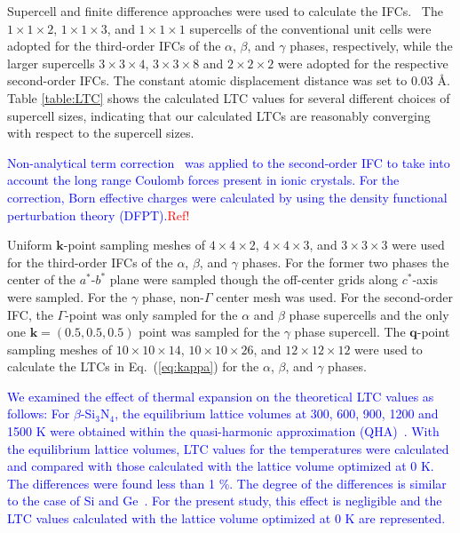 \documentclass[twocolumn,amsmath,amssymb,a4paper,prb,superscriptaddress,floatfix]{revtex4-1}
\begin{document}
Supercell and finite difference approaches were used to calculate the
IFCs.~\cite{wei-supercell} The $1\times 1\times2$, $1\times 1\times3$, and
$1\times 1\times1$ supercells of the conventional unit cells were adopted for
the third-order IFCs of the $\alpha$, $\beta$, and $\gamma$ phases,
respectively, while the larger supercells $3\times 3\times4$, $3\times
3\times8$ and $2\times 2\times2$ were adopted for the respective second-order
IFCs.  The constant atomic displacement distance was set to 0.03 \AA.  Table
\ref{table:LTC} shows the calculated LTC values for several different choices
of supercell sizes, indicating that our calculated LTCs are reasonably
converging with respect to the supercell sizes. 

\textcolor{blue}{Non-analytical term correction~\cite{wang} was applied to the
second-order IFC to take into account the long range Coulomb forces present in
ionic crystals. For the correction, Born effective charges were calculated by
using the density functional perturbation theory (DFPT).}\textcolor{red}{Ref!}

Uniform $\mathbf{k}$-point sampling meshes of $4\times 4\times 2$,
$4\times 4\times 3$, and $3\times 3\times 3$ were used for the
third-order IFCs of the $\alpha$, $\beta$, and $\gamma$ phases. For the
former two phases the center of the $a^*$-$b^*$ plane were sampled
though the off-center grids along $c^*$-axis were sampled. For the
$\gamma$ phase, non-$\Gamma$ center mesh was used. For the second-order
IFC, the $\Gamma$-point was only sampled for the $\alpha$ and $\beta$
phase supercells and the only one $\mathbf{k}=(0.5, 0.5, 0.5)$ point was
sampled for the $\gamma$ phase supercell. The $\mathbf{q}$-point
sampling meshes of $10\times 10\times 14$, $10\times 10\times 26$, and
$12\times 12\times 12$ were used to calculate the LTCs in Eq.~(\ref{eq:kappa})
for the $\alpha$, $\beta$, and $\gamma$ phases.

\textcolor {blue}{We examined the effect of thermal expansion on the
theoretical LTC values as follows: For $\beta$-Si$_3$N$_4$, the equilibrium
lattice volumes at 300, 600, 900, 1200 and 1500 K were obtained within the
quasi-harmonic approximation (QHA)~\cite{dove-p76}.  With the equilibrium
lattice volumes, LTC values for the temperatures were calculated and
compared with those calculated with the lattice volume optimized at 0 K.
The differences were found less than 1 \%. The degree of the differences is
similar to the case of Si and Ge~\cite{ward-ltc}.  For the present study, this
effect is negligible and the LTC values calculated with the lattice volume
optimized at 0 K are represented.}
\end{document}
